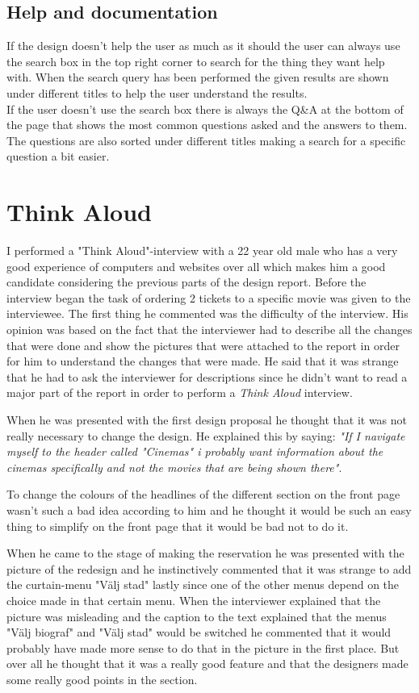 \documentclass[a4paper,11pt]{article}
\begin{document}
\subsection{Help and documentation}
If the design doesn't help the user as much as it should the user can always use the search box in the top right corner to search for the thing they want help with. When the search query has been performed the given results are shown under different titles to help the user understand the results.\\
If the user doesn't use the search box there is always the Q\&A at the bottom of the page that shows the most common questions asked and the answers to them. The questions are also sorted under different titles making a search for a specific question a bit easier.

\newpage
\section{Think Aloud}
I performed a "Think Aloud"-interview with a 22 year old male who has a very good experience of computers and websites over all which makes him a good candidate considering the previous parts of the design report. Before the interview began the task of ordering 2 tickets to a specific movie was given to the interviewee. 
The first thing he commented was the difficulty of the interview. His opinion was based on the fact that the interviewer had to describe all the changes that were done and show the pictures that were attached to the report in order for him to understand the changes that were made. He said that it was strange that he had to ask the interviewer for descriptions since he didn't want to read a major part of the report in order to perform a \textit{Think Aloud} interview.

When he was presented with the first design proposal he thought that it was not really necessary to change the design. He explained this by saying: \textit{"If I navigate myself to the header called "Cinemas" i probably want information about the cinemas specifically and not the movies that are being shown there"}.

To change the colours of the headlines of the different section on the front page wasn't such a bad idea according to him and he thought it would be such an easy thing to simplify on the front page that it would be bad not to do it.

When he came to the stage of making the reservation he was presented with the picture of the redesign and he instinctively commented that it was strange to add the curtain-menu "V\"alj stad" lastly since one of the other menus depend on the choice made in that certain menu. When the interviewer explained that the picture was misleading and the caption to the text explained that the menus "V\"alj biograf" and "V\"alj stad" would be switched he commented that it would probably have made more sense to do that in the picture in the first place. But over all he thought that it was a really good feature and that the designers made some really good points in the section.
\end{document}
